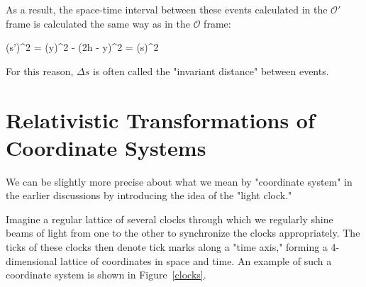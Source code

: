 \documentclass[11pt]{article}
\begin{document}
As a result, the space-time interval between these events calculated in the $\mathcal{O'}$ frame is calculated the same way as in the $\mathcal{O}$ frame:

\beq
\Rightarrow \Rightarrow (\Delta s')^2 = (\Delta y)^2 - (2h - \Delta y)^2 = (\Delta s)^2
\label{deltas2}
\eeq

For this reason, $\Delta s$ is often called the "invariant distance" between events.

\section{Relativistic Transformations of Coordinate Systems}

We can be slightly more precise about what we mean by "coordinate system" in the earlier discussions by introducing the idea of the "light clock."

Imagine a regular lattice of several clocks through which we regularly shine beams of light from one to the other to synchronize the clocks appropriately. The ticks of these clocks then denote tick marks along a "time axis," forming a 4-dimensional lattice of coordinates in space and time. An example of such a coordinate system is shown in Figure~\ref{clocks}.
\end{document}
